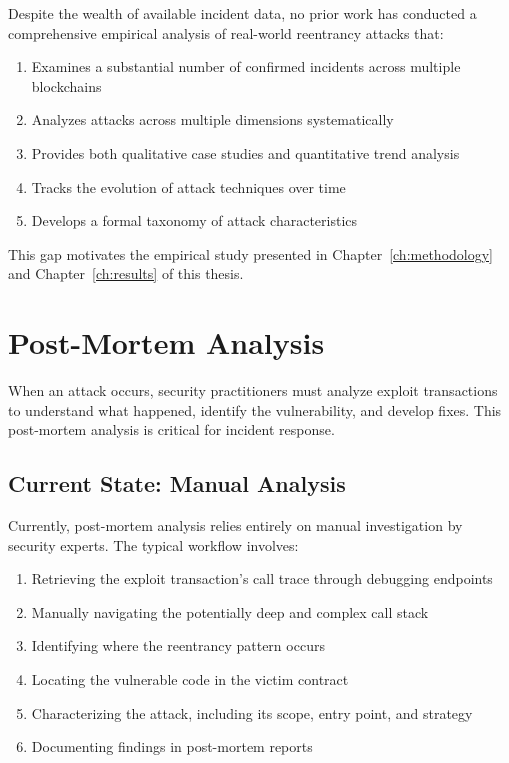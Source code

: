 Despite the wealth of available incident data, no prior work has conducted a comprehensive empirical analysis of real-world reentrancy attacks that:
\begin{enumerate}
    \item Examines a substantial number of confirmed incidents across multiple blockchains
    \item Analyzes attacks across multiple dimensions systematically
    \item Provides both qualitative case studies and quantitative trend analysis
    \item Tracks the evolution of attack techniques over time
    \item Develops a formal taxonomy of attack characteristics
\end{enumerate}

This gap motivates the empirical study presented in Chapter~\ref{ch:methodology} and Chapter~\ref{ch:results} of this thesis.

\section{Post-Mortem Analysis}
\label{sec:rw-postmortem}

When an attack occurs, security practitioners must analyze exploit transactions to understand what happened, identify the vulnerability, and develop fixes. This post-mortem analysis is critical for incident response.

\subsection{Current State: Manual Analysis}

Currently, post-mortem analysis relies entirely on manual investigation by security experts. The typical workflow involves:
\begin{enumerate}
    \item Retrieving the exploit transaction's call trace through debugging endpoints
    \item Manually navigating the potentially deep and complex call stack
    \item Identifying where the reentrancy pattern occurs
    \item Locating the vulnerable code in the victim contract
    \item Characterizing the attack, including its scope, entry point, and strategy
    \item Documenting findings in post-mortem reports
\end{enumerate}

